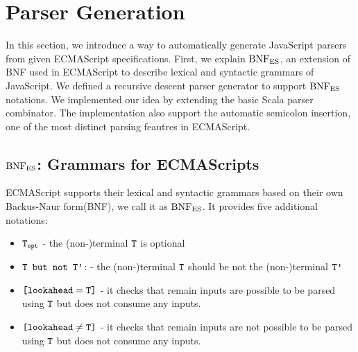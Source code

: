 \section{Parser Generation}

In this section, we introduce a way to automatically generate JavaScript parsers
from given ECMAScript specifications. First, we explain \( \text{BNF}_{\text{ES}} \), an extension
of BNF used in ECMAScript to describe lexical and syntactic grammars of JavaScript.
We defined a recursive descent parser generator to support \( \text{BNF}_{\text{ES}} \) notations.
We implemented our idea by extending the basic Scala parser combinator.
The implementation also support the automatic semicolon insertion,
one of the most distinct parsing feautres in ECMAScript.

\subsection{\( \text{BNF}_{\text{ES}} \): Grammars for ECMAScripts}

ECMAScript supports their lexical and syntactic grammars based on
their own Backus-Naur form(BNF), we call it as \( \text{BNF}_{\text{ES}} \).
It provides five additional notations:
\begin{itemize}
  \item \( \texttt{T}_{\texttt{opt}} \)
    - the (non-)terminal \( \texttt{T} \) is optional
  \item \( \texttt{T but not T'} \):
    - the (non-)terminal \( \texttt{T} \) should be not the (non-)terminal \( \texttt{T'} \)
  \item \( \texttt{[lookahead} = \texttt{T]} \)
    - it checks that remain inputs are possible to be parsed using \( \texttt{T} \)
    but does not consume any inputs.
  \item \( \texttt{[lookahead} \neq \texttt{T]} \)
    - it checks that remain inputs are not possible to be parsed using \( \texttt{T} \)
    but does not consume any inputs.
\end{itemize}

